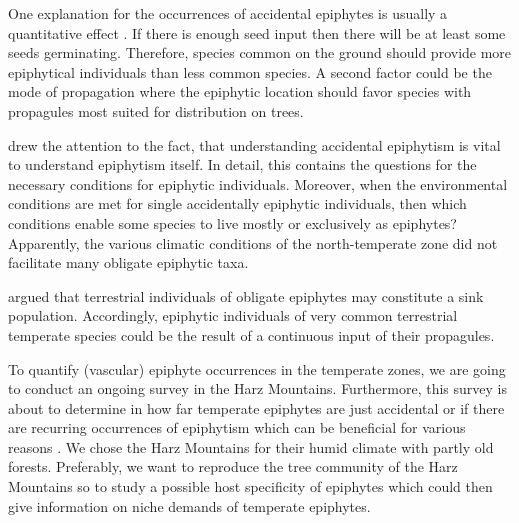 \documentclass[12pt, a4paper, oneside, draft]{scrartcl}
\begin{document}
	One explanation for the occurrences of accidental epiphytes is usually a quantitative effect \cim. If there is enough seed input then there will be at least some seeds germinating. Therefore, species common on the ground should provide more epiphytical individuals than less common species. A second factor could be the mode of propagation where the epiphytic location should favor species with propagules most suited for distribution on trees. 
	
	
	
	
	
	\textcite{Zotz2003} drew the attention to the fact, that understanding accidental epiphytism is vital to understand epiphytism itself. In detail, this contains the questions for the necessary conditions for epiphytic individuals. Moreover, when the environmental conditions are met for single accidentally epiphytic individuals, then which conditions enable some species to live mostly or exclusively as epiphytes? Apparently, the various climatic conditions of the north-temperate zone did not facilitate many obligate epiphytic taxa.
	
	\textcite{Burns2010} argued that terrestrial individuals of obligate epiphytes may constitute a sink population. Accordingly, epiphytic individuals of very common terrestrial temperate species could be the result of a continuous input of their propagules.
	
	
	To quantify (vascular) epiphyte occurrences in the temperate zones, we are going to conduct an ongoing survey in the Harz Mountains. Furthermore, this survey is about to determine in how far temperate epiphytes are just accidental or if there are recurring occurrences of epiphytism which can be beneficial for various reasons . We chose the Harz Mountains for their humid climate with partly old forests. Preferably, we want to reproduce the tree community of the Harz Mountains so to study a possible host specificity of epiphytes which could then give information on niche demands of temperate epiphytes.
	
\end{document}
